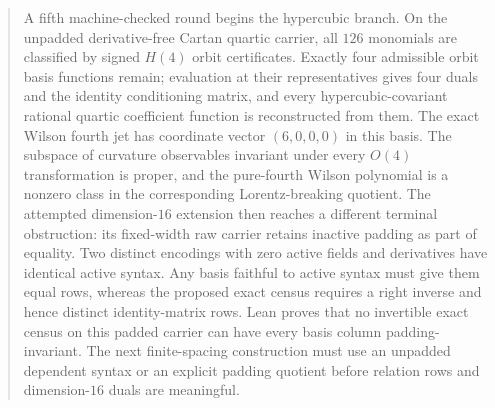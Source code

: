 \documentclass[11pt]{article}
\theoremstyle{definition}
\begin{document}
\begin{abstract}
A fifth machine-checked round begins the hypercubic branch. On the unpadded
derivative-free Cartan quartic carrier, all $126$ monomials are classified by
signed $H(4)$ orbit certificates. Exactly four admissible orbit basis
functions remain; evaluation at their representatives gives four duals and
the identity conditioning matrix, and every hypercubic-covariant rational
quartic coefficient function is reconstructed from them. The exact Wilson
fourth jet has coordinate vector $(6,0,0,0)$ in this basis. The subspace of
curvature observables invariant under every $O(4)$ transformation is proper,
and the pure-fourth Wilson polynomial is a nonzero class in the corresponding
Lorentz-breaking quotient. The attempted dimension-$16$
extension then reaches a different terminal obstruction: its
fixed-width raw carrier retains inactive padding as part of equality. Two
distinct encodings with zero active fields and derivatives have identical
active syntax. Any basis faithful to active syntax must give them equal rows,
whereas the proposed exact census requires a right inverse and hence distinct
identity-matrix rows. Lean proves that no invertible exact census on this
padded carrier can have every basis column padding-invariant. The next
finite-spacing construction must use an unpadded dependent syntax or an
explicit padding quotient before relation rows and dimension-$16$ duals are
meaningful.


\end{abstract}
\end{document}
